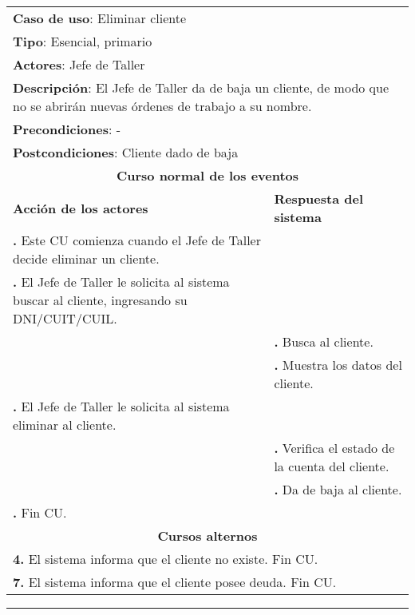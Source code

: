 \documentclass[12pt]{extarticle}
\begin{document}


    \newcommand\inc{\stepcounter{step}\textbf{\thestep. }}
    \newcommand\resetinc{\setcounter{step}{0}}
    
    \newcommand\raya{\noindent\rule{169mm}{0.8mm}\\}

	\begin{longtable}{ |p{8cm}|p{8cm}| }
		\hline
		\multicolumn{2}{|p{16cm}|}{\textbf{Caso de uso}: Eliminar cliente}\\
		\multicolumn{2}{|p{16cm}|}{\textbf{Tipo}: Esencial, primario}\\
		\multicolumn{2}{|p{16cm}|}{\textbf{Actores}: Jefe de Taller}\\
		\multicolumn{2}{|p{16cm}|}{\textbf{Descripción}: El Jefe de Taller da de baja un cliente, de modo que no se abrirán nuevas órdenes de trabajo a su nombre.}\\
		\multicolumn{2}{|p{16cm}|}{\textbf{Precondiciones}: -}\\
		\multicolumn{2}{|p{16cm}|}{\textbf{Postcondiciones}: Cliente dado de baja}\\
		\hline
		\multicolumn{2}{|c|}{\textbf{Curso normal de los eventos}}\\
		\hline
		\textbf{Acción de los actores} & \textbf{Respuesta del sistema}\\
		\hline
			\inc Este CU comienza cuando el Jefe de Taller decide eliminar un cliente.& \\
			\hline
			\inc  El Jefe de Taller le solicita al sistema buscar al cliente, ingresando su DNI/CUIT/CUIL. & \\
			\hline
			& \inc Busca al cliente. \\
			\hline
			& \inc Muestra los datos del cliente. \\
			\hline
			\inc El Jefe de Taller le solicita al sistema eliminar al cliente.&\\
			\hline
			& \inc Verifica el estado de la cuenta del cliente. \\
			\hline
			& \inc Da de baja al cliente. \\
			\hline
			\inc Fin CU. & \\
		\hline
		\multicolumn{2}{|c|}{\textbf{Cursos alternos}}\\
		\hline
		\multicolumn{2}{|p{16cm}|}{\textbf{4. }El sistema informa que el cliente no existe. Fin CU.}\\
		\hline
		\multicolumn{2}{|p{16cm}|}{\textbf{7. }El sistema informa que el cliente posee deuda. Fin CU.}\\
		\hline	
	\end{longtable}

    \setcounter{step}{0}

    \noindent\rule{169mm}{0.8mm}\\
\end{document}
